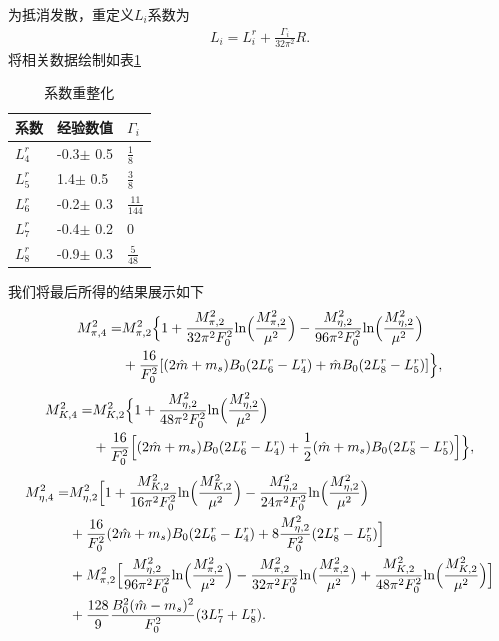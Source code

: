 \documentclass[aps,tightenlines,16pt]{ctexart}
\numberwithin{equation}{section}
\begin{document}
为抵消发散，重定义$L_i$系数为
\begin{align}
   L_i = L_i^r+\frac{\Gamma_i}{32\pi^2}R.
\end{align}
将相关数据绘制如表\ref{lr}
\begin{table}[htp]
   \centering
   \begin{tabular}{lll}
      \hline
      系数 & 经验数值 & $\Gamma_i$\\
      \hline
      $L_4^r$ & -0.3$\pm$ 0.5&$\frac{1}{8}$\\
      $L_5^r$ & 1.4$\pm$ 0.5&$\frac{3}{8}$\\
      $L_6^r$ & -0.2$\pm$ 0.3&$\frac{11}{144}$\\
      $L_7^r$ & -0.4$\pm$ 0.2&0\\
      $L_8^r$ & -0.9$\pm$ 0.3&$\frac{5}{48}$\\
      \hline
   \end{tabular}\caption{系数重整化}\label{lr}
\end{table}

我们将最后所得的结果展示如下
\begin{align}
   \begin{aligned}
   M^{2}_{\pi,4}=&M^2_{\pi,2}\Bigl\{1+\frac{M_{\pi,2}^2}{32\pi^2F_0^2}\text{ln}\Bigl(\frac{M_{\pi,2}^2}{\mu^2}\Bigr) -\frac{M_{\eta,2}^2}{96\pi^2F_0^2}\text{ln}\Bigl(\frac{M_{\eta,2}^2}{\mu^2}\Bigr) \\
   &+\frac{16}{F_0^2}[(2\hat{m}+m_s)B_0(2L_6^r-L_4^r)+\hat{m}B_0(2L_8^r-L_5^r)]\Bigr\},
   \end{aligned}
\end{align}
\begin{align}
   \begin{aligned}
      M_{K,4}^2 = &M_{K,2}^2\Bigl\{1+\frac{M_{\eta,2}^2}{48\pi^2F_0^2}\text{ln}\Bigl(\frac{M_{\eta,2}^2}{\mu^2}\Bigr)\\
      &+\frac{16}{F_0^2}\Bigl[(2\hat{m}+m_s)B_0(2L_6^r-L_4^r)+\frac{1}{2}(\hat{m}+m_s)B_0(2L_8^r-L_5^r)\Bigr]
      \Bigr\},
   \end{aligned}
\end{align}
\begin{align}
   \begin{aligned}
      M_{\eta,4}^2 =& M_{\eta,2}^2\Bigl[1+\frac{M_{K,2}^2}{16\pi^2F_0^2}\text{ln}\Bigl(\frac{M_{K,2}^2}{\mu^2}\Bigr)-\frac{M_{\eta,2}^2}{24\pi^2F_0^2}\text{ln}\Bigl(\frac{M_{\eta,2}^2}{\mu^2}\Bigr)\\
      &+\frac{16}{F_0^2}(2\hat{m}+m_s)B_0(2L_6^r-L_4^r)+8\frac{M_{\eta,2}^2}{F_0^2}(2L_8^r-L_5^r)\Bigr]\\
      &+M_{\pi,2}^2\Bigl[\frac{M_{\eta,2}^2}{96\pi^2F_0^2}\text{ln}\Bigl(\frac{M_{\pi,2}^2}{\mu^2}\Bigr)-\frac{M_{\pi,2}^2}{32\pi^2F_0^2}\text{ln}\bigl(\frac{M_{\pi,2}^2}{\mu^2}\bigr)+\frac{M_{K,2}^2}{48\pi^2F_0^2}\text{ln}\Bigl(\frac{M_{K,2}^2}{\mu^2}\Bigr)\Bigr]\\
      &+\frac{128}{9}\frac{B_0^2(\hat{m}-m_s)^2}{F_0^2}(3L_7^r+L_8^r).
   \end{aligned}
\end{align}
\end{document}
